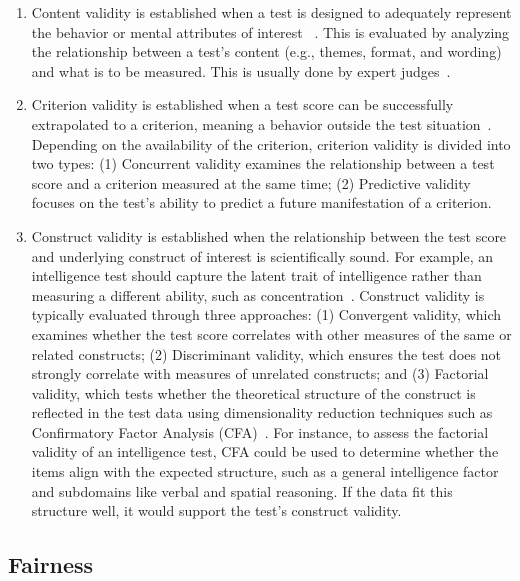 \documentclass{DESSThesis}
\begin{document}
\begin{enumerate}
	\item Content validity is established when a test is designed to adequately represent the behavior or mental attributes of interest ~\cite{moosbrugger_testtheorie_2020}. This is evaluated by analyzing the relationship between a test’s content (e.g., themes, format, and wording) and what is to be measured. This is usually done by expert judges~\cite{american_educational_research_association_standards_2014}.
	\item Criterion validity is established when a test score can be successfully extrapolated to a criterion, meaning a behavior outside the test situation~\cite{moosbrugger_testtheorie_2020}. Depending on the availability of the criterion, criterion validity is divided into two types: (1) Concurrent validity examines the relationship between a test score and a criterion measured at the same time; (2) Predictive validity focuses on the test’s ability to predict a future manifestation of a criterion.
	\item Construct validity is established when the relationship between the test score and underlying construct of interest is scientifically sound. For example, an intelligence test should capture the latent trait of intelligence rather than measuring a different ability, such as concentration~\cite{moosbrugger_testtheorie_2020}. Construct validity is typically evaluated through three approaches: (1) Convergent validity, which examines whether the test score correlates with other measures of the same or related constructs; (2) Discriminant validity, which ensures the test does not strongly correlate with measures of unrelated constructs; and (3) Factorial validity, which tests whether the theoretical structure of the construct is reflected in the test data using dimensionality reduction techniques such as Confirmatory Factor Analysis (CFA)~\cite{american_educational_research_association_standards_2014, moosbrugger_testtheorie_2020, rammstedt_reliabilitat_2010}. For instance, to assess the factorial validity of an intelligence test, CFA could be used to determine whether the items align with the expected structure, such as a general intelligence factor and subdomains like verbal and spatial reasoning. If the data fit this structure well, it would support the test’s construct validity.
\end{enumerate}


\subsection{Fairness}
\label{sec:background-fairness}
\end{document}
